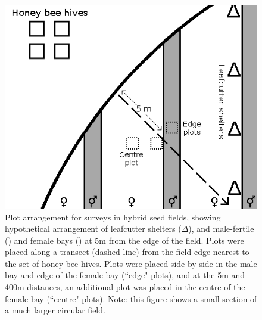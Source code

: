 \begin{figure}[h]
    \centering
    \includegraphics[width=\textwidth,keepaspectratio=true]{seedfieldPlots.png}
    \caption[Plot arrangement for surveys in hybrid seed fields]{Plot arrangement for surveys in hybrid seed fields, showing hypothetical arrangement of leafcutter shelters ($\Delta$), and male-fertile (\Hermaphrodite) and female bays (\Female) at 5m from the edge of the field. Plots were placed along a transect (dashed line) from the field edge nearest to the set of honey bee hives. Plots were placed side-by-side in the male bay and edge of the female bay (``edge" plots), and at the 5m and 400m distances, an additional plot was placed in the centre of the female bay (``centre" plots). Note: this figure shows a small section of a much larger circular field.}
    \label{fig:seedfieldPlots}
\end{figure}

